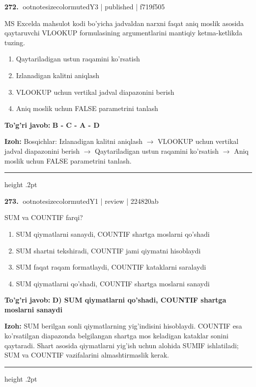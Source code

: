 \documentclass[10pt,a4paper]{article}
\begin{document}
\textbf{\color{ink}272.} {ootnotesizecolor{muted}Y3 | published | f719f505}
\par
MS Excelda mahsulot kodi bo'yicha jadvaldan narxni faqat aniq moslik asosida qaytaruvchi VLOOKUP formulasining argumentlarini mantiqiy ketma-ketlikda tuzing.
\begin{enumerate}[label=\Alph*),leftmargin=9mm]
\item Qaytariladigan ustun raqamini ko'rsatish
\item Izlanadigan kalitni aniqlash
\item VLOOKUP uchun vertikal jadval diapazonini berish
\item Aniq moslik uchun FALSE parametrini tanlash
\end{enumerate}
\begin{tcolorbox}[enhanced,breakable,colback=teal!4,colframe=teal!55!black,boxrule=0.45pt,arc=1.2mm,left=2.8mm,right=2.8mm,top=2mm,bottom=2mm]
\textbf{\color{teal}To'g'ri javob:} \textbf{B - C - A - D}
\par\smallskip
\textbf{Izoh:} Bosqichlar: Izlanadigan kalitni aniqlash \ensuremath{\rightarrow} VLOOKUP uchun vertikal jadval diapazonini berish \ensuremath{\rightarrow} Qaytariladigan ustun raqamini ko'rsatish \ensuremath{\rightarrow} Aniq moslik uchun FALSE parametrini tanlash.
\end{tcolorbox}
\vspace{2mm}\hrule height .2pt\vspace{2mm}

\textbf{\color{ink}273.} {ootnotesizecolor{muted}Y1 | review | 224820ab}
\par
SUM va COUNTIF farqi?
\begin{enumerate}[label=\Alph*),leftmargin=9mm]
\item SUM qiymatlarni sanaydi, COUNTIF shartga moslarni qo'shadi
\item SUM shartni tekshiradi, COUNTIF jami qiymatni hisoblaydi
\item SUM faqat raqam formatlaydi, COUNTIF kataklarni saralaydi
\item SUM qiymatlarni qo'shadi, COUNTIF shartga moslarni sanaydi
\end{enumerate}
\begin{tcolorbox}[enhanced,breakable,colback=teal!4,colframe=teal!55!black,boxrule=0.45pt,arc=1.2mm,left=2.8mm,right=2.8mm,top=2mm,bottom=2mm]
\textbf{\color{teal}To'g'ri javob:} \textbf{D) SUM qiymatlarni qo'shadi, COUNTIF shartga moslarni sanaydi}
\par\smallskip
\textbf{Izoh:} SUM berilgan sonli qiymatlarning yig'indisini hisoblaydi. COUNTIF esa ko'rsatilgan diapazonda belgilangan shartga mos keladigan kataklar sonini qaytaradi. Shart asosida qiymatlarni yig'ish uchun alohida SUMIF ishlatiladi; SUM va COUNTIF vazifalarini almashtirmaslik kerak.
\end{tcolorbox}
\vspace{2mm}\hrule height .2pt\vspace{2mm}
\end{document}
